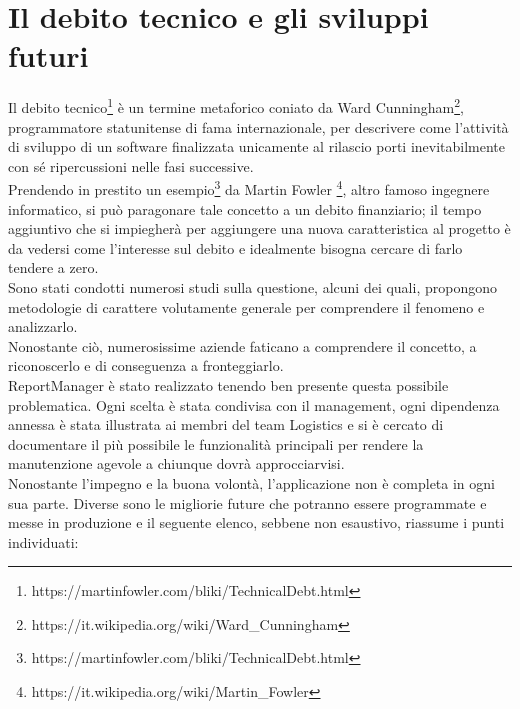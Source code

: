 \chapter{Il debito tecnico e gli sviluppi futuri}\label{c:technical_debt}

Il debito tecnico\footnote{https://martinfowler.com/bliki/TechnicalDebt.html} è un termine metaforico coniato
da Ward Cunningham\footnote{https://it.wikipedia.org/wiki/Ward\_Cunningham}, programmatore statunitense di fama
internazionale, per descrivere come l'attività di sviluppo di un software finalizzata unicamente al rilascio
porti inevitabilmente con sé ripercussioni nelle fasi successive.
\\
Prendendo in prestito un esempio\footnote{https://martinfowler.com/bliki/TechnicalDebt.html} da Martin Fowler
\footnote{https://it.wikipedia.org/wiki/Martin\_Fowler}, altro famoso ingegnere informatico, si può paragonare
tale concetto a un debito finanziario; il tempo aggiuntivo che si impiegherà per aggiungere una nuova
caratteristica al progetto è da vedersi come l'interesse sul debito e idealmente bisogna cercare di farlo tendere
a zero.
\\
Sono stati condotti numerosi studi sulla questione, alcuni dei quali\cite{tom2013exploration}, propongono metodologie
di carattere volutamente generale per comprendere il fenomeno e analizzarlo.
\\
Nonostante ciò, numerosissime aziende faticano a comprendere il concetto, a riconoscerlo e di conseguenza a
fronteggiarlo.
\\
ReportManager è stato realizzato tenendo ben presente questa possibile problematica.
Ogni scelta è stata condivisa con il management, ogni dipendenza annessa è stata illustrata ai membri del team
Logistics e si è cercato di documentare il più possibile le funzionalità principali per rendere la manutenzione
agevole a chiunque dovrà approcciarvisi.
\\
Nonostante l'impegno e la buona volontà, l'applicazione non è completa in ogni sua parte.
Diverse sono le migliorie future che potranno essere programmate e messe in produzione e il seguente elenco,
sebbene non esaustivo, riassume i punti individuati:

